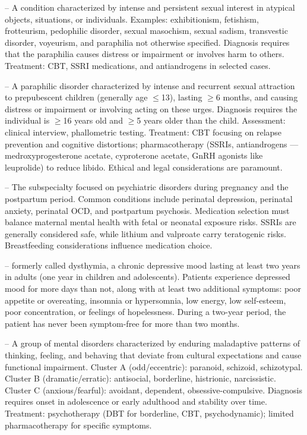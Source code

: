 -- A condition characterized by intense and persistent sexual interest in atypical objects, situations, or individuals. Examples: exhibitionism, fetishism, frotteurism, pedophilic disorder, sexual masochism, sexual sadism, transvestic disorder, voyeurism, and paraphilia not otherwise specified. Diagnosis requires that the paraphilia causes distress or impairment or involves harm to others. Treatment: CBT, SSRI medications, and antiandrogens in selected cases.

-- A paraphilic disorder characterized by intense and recurrent sexual attraction to prepubescent children (generally age \(\le\)13), lasting \(\ge\)6 months, and causing distress or impairment or involving acting on these urges. Diagnosis requires the individual is \(\ge\)16 years old and \(\ge\)5 years older than the child. Assessment: clinical interview, phallometric testing. Treatment: CBT focusing on relapse prevention and cognitive distortions; pharmacotherapy (SSRIs, antiandrogens — medroxyprogesterone acetate, cyproterone acetate, GnRH agonists like leuprolide) to reduce libido. Ethical and legal considerations are paramount.

-- The subspecialty focused on psychiatric disorders during pregnancy and the postpartum period. Common conditions include perinatal depression, perinatal anxiety, perinatal OCD, and postpartum psychosis. Medication selection must balance maternal mental health with fetal or neonatal exposure risks. SSRIs are generally considered safe, while lithium and valproate carry teratogenic risks. Breastfeeding considerations influence medication choice.

-- formerly called dysthymia, a chronic depressive mood lasting at least two years in adults (one year in children and adolescents). Patients experience depressed mood for more days than not, along with at least two additional symptoms: poor appetite or overeating, insomnia or hypersomnia, low energy, low self-esteem, poor concentration, or feelings of hopelessness. During a two-year period, the patient has never been symptom-free for more than two months.

-- A group of mental disorders characterized by enduring maladaptive patterns of thinking, feeling, and behaving that deviate from cultural expectations and cause functional impairment. Cluster A (odd/eccentric): paranoid, schizoid, schizotypal. Cluster B (dramatic/erratic): antisocial, borderline, histrionic, narcissistic. Cluster C (anxious/fearful): avoidant, dependent, obsessive-compulsive. Diagnosis requires onset in adolescence or early adulthood and stability over time. Treatment: psychotherapy (DBT for borderline, CBT, psychodynamic); limited pharmacotherapy for specific symptoms.

